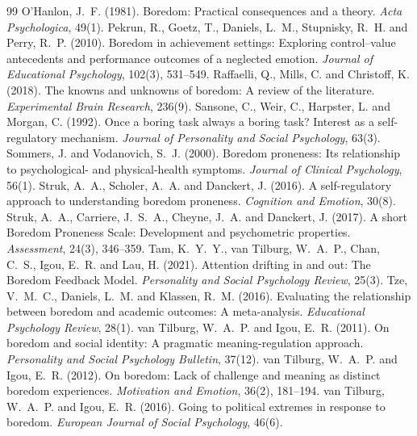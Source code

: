 \documentclass{situationist-preprint}
\begin{document}
\begin{thebibliography}{99}
 O'Hanlon, J.~F. (1981). Boredom: Practical consequences and a theory. \emph{Acta Psychologica}, 49(1).
 Pekrun, R., Goetz, T., Daniels, L.~M., Stupnisky, R.~H. and Perry, R.~P. (2010). Boredom in achievement settings: Exploring control--value antecedents and performance outcomes of a neglected emotion. \emph{Journal of Educational Psychology}, 102(3), 531--549.
 Raffaelli, Q., Mills, C. and Christoff, K. (2018). The knowns and unknowns of boredom: A review of the literature. \emph{Experimental Brain Research}, 236(9).
 Sansone, C., Weir, C., Harpster, L. and Morgan, C. (1992). Once a boring task always a boring task? Interest as a self-regulatory mechanism. \emph{Journal of Personality and Social Psychology}, 63(3).
 Sommers, J. and Vodanovich, S.~J. (2000). Boredom proneness: Its relationship to psychological- and physical-health symptoms. \emph{Journal of Clinical Psychology}, 56(1).
 Struk, A.~A., Scholer, A.~A. and Danckert, J. (2016). A self-regulatory approach to understanding boredom proneness. \emph{Cognition and Emotion}, 30(8).
 Struk, A.~A., Carriere, J.~S.~A., Cheyne, J.~A. and Danckert, J. (2017). A short Boredom Proneness Scale: Development and psychometric properties. \emph{Assessment}, 24(3), 346--359.
 Tam, K.~Y.~Y., van Tilburg, W.~A.~P., Chan, C.~S., Igou, E.~R. and Lau, H. (2021). Attention drifting in and out: The Boredom Feedback Model. \emph{Personality and Social Psychology Review}, 25(3).
 Tze, V.~M.~C., Daniels, L.~M. and Klassen, R.~M. (2016). Evaluating the relationship between boredom and academic outcomes: A meta-analysis. \emph{Educational Psychology Review}, 28(1).
 van Tilburg, W.~A.~P. and Igou, E.~R. (2011). On boredom and social identity: A pragmatic meaning-regulation approach. \emph{Personality and Social Psychology Bulletin}, 37(12).
 van Tilburg, W.~A.~P. and Igou, E.~R. (2012). On boredom: Lack of challenge and meaning as distinct boredom experiences. \emph{Motivation and Emotion}, 36(2), 181--194.
 van Tilburg, W.~A.~P. and Igou, E.~R. (2016). Going to political extremes in response to boredom. \emph{European Journal of Social Psychology}, 46(6).

\end{thebibliography}
\end{document}
